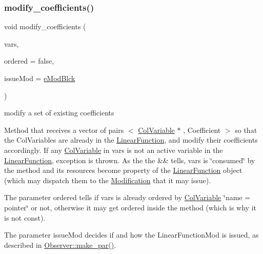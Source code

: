 \subsubsection{\texorpdfstring{modify\+\_\+coefficients()}{modify\_coefficients()}\hspace{0.1cm}{\footnotesize\ttfamily [1/4]}}
{\footnotesize\ttfamily void modify\+\_\+coefficients (\begin{DoxyParamCaption}\item[{\mbox{\hyperlink{class_s_m_spp__di__unipi__it_1_1_linear_function_aee8988faa66c7c9013613e2c76580ddf}{v\+\_\+coeff\+\_\+pair}} \&\&}]{vars,  }\item[{const bool}]{ordered = {\ttfamily false},  }\item[{\mbox{\hyperlink{group___modification___t_y_p_e_s_ga544246d8c462e9a2d817c2c30797968f}{c\+\_\+\+Mod\+Param}}}]{issue\+Mod = {\ttfamily \mbox{\hyperlink{group___modification___t_y_p_e_s_gga48fddcdd03a03f49b7e389ca1ed938d4a21b14b26b1c0093a0905f6fc010bad29}{e\+Mod\+Blck}}} }\end{DoxyParamCaption})}



modify a set of existing coefficients 

Method that receives a vector of pairs $<$ \mbox{\hyperlink{class_s_m_spp__di__unipi__it_1_1_col_variable}{Col\+Variable}} $\ast$ , Coefficient $>$ so that the Col\+Variables are already in the \mbox{\hyperlink{class_s_m_spp__di__unipi__it_1_1_linear_function}{Linear\+Function}}, and modify their coefficients accordingly. If any \mbox{\hyperlink{class_s_m_spp__di__unipi__it_1_1_col_variable}{Col\+Variable}} in vars is not an active variable in the \mbox{\hyperlink{class_s_m_spp__di__unipi__it_1_1_linear_function}{Linear\+Function}}, exception is thrown. As the the \&\& tells, vars is \char`\"{}consumed\char`\"{} by the method and its resources become property of the \mbox{\hyperlink{class_s_m_spp__di__unipi__it_1_1_linear_function}{Linear\+Function}} object (which may dispatch them to the \mbox{\hyperlink{class_s_m_spp__di__unipi__it_1_1_modification}{Modification}} that it may issue).

The parameter ordered tells if vars is already ordered by \mbox{\hyperlink{class_s_m_spp__di__unipi__it_1_1_col_variable}{Col\+Variable}} \char`\"{}name = pointer\char`\"{} or not, otherwise it may get ordered inside the method (which is why it is not const).

The parameter issue\+Mod decides if and how the Linear\+Function\+Mod is issued, as described in \mbox{\hyperlink{class_s_m_spp__di__unipi__it_1_1_observer_a2d499ae38e5e95cf66cd71da32b0694a}{Observer\+::make\+\_\+par()}}. \mbox{\label{class_s_m_spp__di__unipi__it_1_1_linear_function_a91fb9548bbed19895b04e36e764c70ae}} 
